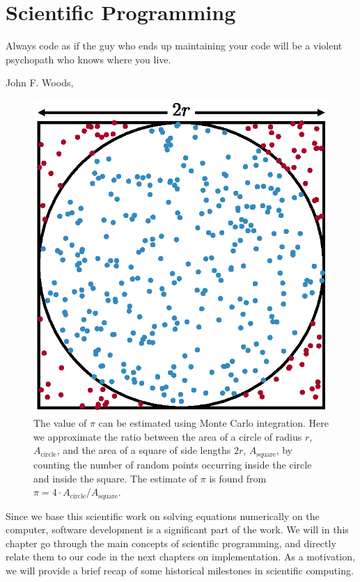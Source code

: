 \chapter{Scientific Programming} \label{chp:scientificprogramming}
\epigraph{Always code as if the guy who ends up maintaining your code will be a violent psychopath who knows where you live.}{John F. Woods, \supercite{woods_usage_nodate}}
\begin{figure}[H]
	\centering
	\includegraphics[scale=0.7]{../Images/montecarlointegration.eps}
	\caption{The value of $\pi$ can be estimated using Monte Carlo integration. Here we approximate the ratio between the area of a circle of radius $r$, $A_{\text{circle}}$, and the area of a square of side lengths $2r$, $A_{\text{square}}$, by counting the number of random points occurring inside the circle and inside the square. The estimate of $\pi$ is found from $\pi=4\cdot A_{\text{circle}}/A_{\text{square}}$.}
	\label{fig:montecarlointegration}
\end{figure}

Since we base this scientific work on solving equations numerically on the computer, software development is a significant part of the work. We will in this chapter go through the main concepts of scientific programming, and directly relate them to our code in the next chapters on implementation. As a motivation, we will provide a brief recap of some historical milestones in scientific computing.

